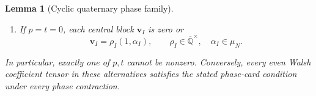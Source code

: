 \documentclass[11pt,letterpaper,onecolumn]{article}
\theoremstyle{plain}
\newtheorem{lemma}[lemma]{Lemma}
\theoremstyle{definition}
\theoremstyle{remark}
\newcommand{\AlgNums}{\overline{\mathbb Q}}
\begin{document}
\begin{lemma}[Cyclic quaternary phase family]
\begin{enumerate}
      block \(\mathbf v_I\) is zero or
      \hypertarget{eq:odd-cyc-q4-nonzero-endpoints}{}
\begin{equation*}
        \mathbf v_I=(-p\lambda\alpha_I^{-1},-p\alpha_I),
        \qquad \alpha_I\in\mu_N.
      \end{equation*}
\item If \(p=t=0\), each central block \(\mathbf v_I\) is zero or
      \[
        \mathbf v_I=\rho_I(1,\alpha_I),
        \qquad \rho_I\in\AlgNums^\times,
        \quad \alpha_I\in\mu_N.
      \]
\end{enumerate}
In particular, exactly one of \(p,t\) cannot be nonzero.
Conversely, every even Walsh coefficient tensor in these alternatives satisfies the stated
phase-card condition under every phase contraction.
\end{lemma}
\end{document}
